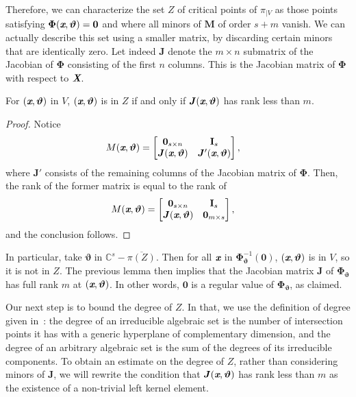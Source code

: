 \documentclass[sigconf]{acmart}
\def\Xb{\textit{\textbf{X}}}
\def\thetab{\bm{\vartheta}}
\def\xb{\textit{\textbf{x}}}
\def\C{\mathbb{C}}
\def\dt{s}
\def\bbm{\begin{bmatrix}}
\def\ebm{\end{bmatrix}}
\begin{document}
Therefore, we can characterize the set $Z$ of critical points of
$\pi_{|V}$ as those points satisfying $\bm\Phi(\xb,\thetab)=\bm 0$ and
where all minors of $\bm M$ of order $\dt+m$ vanish. We can actually
describe this set using a smaller matrix, by discarding certain minors
that are identically zero. Let indeed $\bm J$ denote the $m \times n$
submatrix of the Jacobian of $\bm\Phi$ consisting of the first $n$
columns. This is the Jacobian matrix of $\bm \Phi$ with respect to $\Xb$.
\begin{lemma} 
  For $(\xb,\thetab)$ in $V$, $(\xb,\thetab)$ is in $Z$ if and only if
  $\bm J(\xb,\thetab)$ has rank less than $m$.
\end{lemma}
\begin{proof}
Notice 
%
\begin{align*}
M(\xb,\thetab)&= 
\bbm 
\textbf{0}_{\dt \times n} &\textbf{I}_{\dt} \\
\bm J(\xb,\thetab)     &\bm J'(\xb,\thetab)
\ebm,
\end{align*}
where $\bm J'$ consists of the remaining columns of the Jacobian matrix of
$\bm\Phi$.  Then, the rank of the former matrix is equal to the rank
of
\begin{align*}
M(\xb,\thetab)&= 
\bbm 
\textbf{0}_{\dt \times n} &\textbf{I}_{\dt} \\
\bm J(\xb,\thetab)     & \bm 0_{m \times s}
\ebm,
\end{align*}
and the conclusion follows.
\end{proof}

In particular, take $\thetab$ in $\C^\dt - \overline{\pi(Z)}$.
Then for all $\xb$ in $\bm \Phi_{\thetab}^{-1}(\bm 0)$, $(\xb,\thetab)$
is in $V$, so it is not in $Z$. The previous lemma then implies that
the Jacobian matrix $\bm J$ of $\bm\Phi_{\thetab}$ has full rank $m$ at
$(\xb,\thetab)$. In other words, $\bm 0$ is a regular value of $\bm
\Phi_{\thetab}$, as claimed.

Our next step is to bound the degree of $Z$.  In that, we use the
definition of degree given in~\cite{H}: the degree of an irreducible
algebraic set is the number of intersection points it has with a
generic hyperplane of complementary dimension, and the degree of an
arbitrary algebraic set is the sum of the degrees of its irreducible
components.  To obtain an estimate on the degree of $Z$, rather than
considering minors of $\bm J$, we will rewrite the condition that $\bm
J(\xb,\thetab)$ has rank less than $m$ as the existence of a
non-trivial left kernel element.
\end{document}
